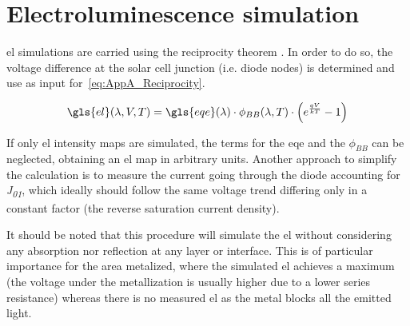 \section{Electroluminescence simulation}
\gls{el} simulations are carried using the reciprocity theorem \cite{Rau2007,Kirchartz2008,Geisz2015}. In order to do so, the voltage difference at the solar cell junction (i.e. diode nodes) is determined and use as input for \equ\,\eqref{eq:AppA_Reciprocity}.

\begin{equation}\label{eq:AppA_Reciprocity}
 \gls{el}(\lambda,V,T) = \gls{eqe}(\lambda)\cdot\phi_{BB}(\lambda,T)\cdot\Big(e^{\frac{qV}{kT}}-1\Big)
\end{equation}

If only \gls{el} intensity maps are simulated, the terms for the \gls{eqe} and the $\phi_{BB}$ can be neglected, obtaining an \gls{el} map in arbitrary units. Another approach to simplify the calculation is to measure the current going through the diode accounting for \textit{J\textsubscript{01}}, which ideally should follow the same voltage trend differing only in a constant factor (the reverse saturation current density).

It should be noted that this procedure will simulate the \gls{el} without considering any absorption nor reflection at any layer or interface. This is of particular importance for the area metalized, where the simulated \gls{el} achieves a maximum (the voltage under the metallization is usually higher due to a lower series resistance) whereas there is no measured \gls{el} as the metal blocks all the emitted light. 

